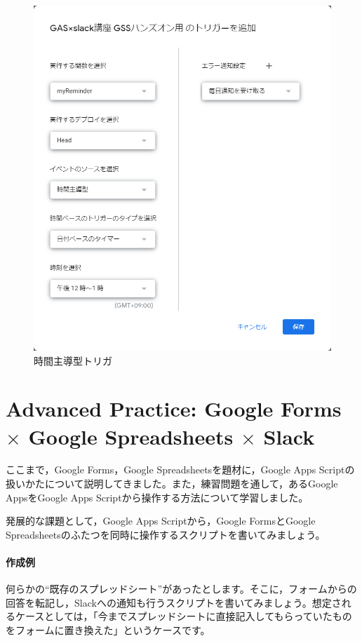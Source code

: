 \documentclass[uplatex,a4j]{jsarticle}
\begin{document}
\begin{figure}[H]
 \centering
 \includegraphics[keepaspectratio, scale=0.7]{images/time_based_trigger.png}
 \caption{時間主導型トリガ}
 \label{fig:time_based_trigger}
\end{figure}

\section{Advanced Practice: Google Forms $\times$ Google Spreadsheets $\times$ Slack}

ここまで，Google Forms，Google Spreadsheetsを題材に，Google Apps Scriptの扱いかたについて説明してきました。また，練習問題を通して，あるGoogle AppsをGoogle Apps Scriptから操作する方法について学習しました。

発展的な課題として，Google Apps Scriptから，Google FormsとGoogle Spreadsheetsのふたつを同時に操作するスクリプトを書いてみましょう。

\paragraph{作成例} 
何らかの``既存のスプレッドシート''があったとします。そこに，フォームからの回答を転記し，Slackへの通知も行うスクリプトを書いてみましょう。想定されるケースとしては，「今までスプレッドシートに直接記入してもらっていたものをフォームに置き換えた」というケースです。
\end{document}
